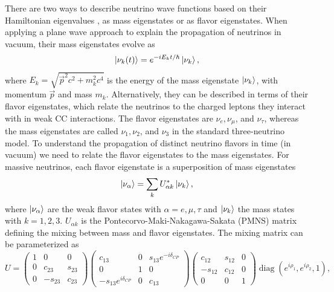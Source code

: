 There are two ways to describe neutrino wave functions based on their Hamiltonian eigenvalues \cite{BILENKY1978225}, as mass eigenstates or as flavor eigenstates.
When applying a plane wave approach to explain the propagation of neutrinos in vacuum, their mass eigenstates evolve as
\begin{equation}
    \ket{\nu_k(t)} = e^{-iE_kt/\hbar}\ket{\nu_k},
    \label{eq:flavor_time_evol}
\end{equation}
where $E_k=\sqrt{\vec{p}^2c^2+m_k^2c^4}$ is the energy of the mass eigenstate $\ket{\nu_k}$, with momentum $\vec{p}$ and mass $m_k$.
Alternatively, they can be described in terms of their flavor eigenstates, which relate the neutrinos to the charged leptons they interact with in weak CC interactions.
The flavor eigenstates are $\nu_e, \nu_\mu$, and $\nu_\tau$, whereas the mass eigenstates are called $\nu_1, \nu_2$, and $\nu_3$ in the standard three-neutrino model.
To understand the propagation of distinct neutrino flavors in time (in vacuum) we need to relate the flavor eigenstates to the mass eigenstates.
For massive neutrinos, each flavor eigenstate is a superposition of mass eigenstates \cite{PhysRevD.98.030001}
\begin{equation}
    \ket{\nu_\alpha} = \sum_kU^*_{\alpha k}\ket{\nu_k},
    \label{eq:neutrino_mixing}
\end{equation}
where $\ket{\nu_\alpha}$ are the weak flavor states with $\alpha=e,\mu,\tau$ and $\ket{\nu_k}$ the mass states with $k=1,2,3$.
$U_{\alpha k}$ is the Pontecorvo-Maki-Nakagawa-Sakata (PMNS) matrix defining the mixing between mass and flavor eigenstates.
The mixing matrix can be parameterized as \cite{PhysRevD.98.030001}
\begin{equation}
    U=\left( 
    \begin{matrix}
        1 & 0 & 0 \\
        0 & c_{23}  & s_{23} \\
        0 & -s_{23} & c_{23} 
    \end{matrix}
    \right) 
    \left( 
    \begin{matrix}
        c_{13} & 0 & s_{13}e^{-i\delta_{CP}} \\
        0 & 1 & 0\\
        -s_{13} e^{i\delta_{CP}} & 0 & c_{13}
    \end{matrix}
    \right ) 
    \left ( 
    \begin{matrix}
        c_{12} & s_{12} & 0 \\
        -s_{12} & c_{12} & 0\\
        0 & 0 & 1
    \end{matrix} 
    \right )  
    \operatorname{diag}(e^{i\rho_{1}},e^{i\rho_{2}},1),
    \label{eq:PMNS_matrix}
\end{equation}
